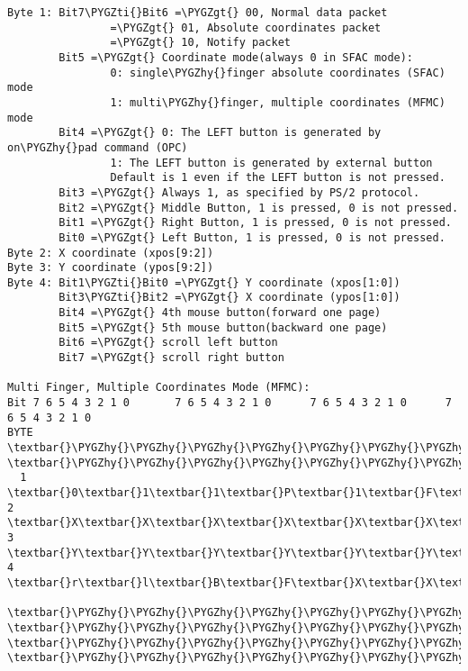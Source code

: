 \documentclass[a4paper,8pt,english]{sphinxmanual}
\def\PYGZgt{\char`\>}
\def\PYGZhy{\char`\-}
\def\PYGZti{\char`\~}
\begin{document}
\begin{Verbatim}[commandchars=\\\{\}]
Byte 1: Bit7\PYGZti{}Bit6 =\PYGZgt{} 00, Normal data packet
                =\PYGZgt{} 01, Absolute coordinates packet
                =\PYGZgt{} 10, Notify packet
        Bit5 =\PYGZgt{} Coordinate mode(always 0 in SFAC mode):
                0: single\PYGZhy{}finger absolute coordinates (SFAC) mode
                1: multi\PYGZhy{}finger, multiple coordinates (MFMC) mode
        Bit4 =\PYGZgt{} 0: The LEFT button is generated by on\PYGZhy{}pad command (OPC)
                1: The LEFT button is generated by external button
                Default is 1 even if the LEFT button is not pressed.
        Bit3 =\PYGZgt{} Always 1, as specified by PS/2 protocol.
        Bit2 =\PYGZgt{} Middle Button, 1 is pressed, 0 is not pressed.
        Bit1 =\PYGZgt{} Right Button, 1 is pressed, 0 is not pressed.
        Bit0 =\PYGZgt{} Left Button, 1 is pressed, 0 is not pressed.
Byte 2: X coordinate (xpos[9:2])
Byte 3: Y coordinate (ypos[9:2])
Byte 4: Bit1\PYGZti{}Bit0 =\PYGZgt{} Y coordinate (xpos[1:0])
        Bit3\PYGZti{}Bit2 =\PYGZgt{} X coordinate (ypos[1:0])
        Bit4 =\PYGZgt{} 4th mouse button(forward one page)
        Bit5 =\PYGZgt{} 5th mouse button(backward one page)
        Bit6 =\PYGZgt{} scroll left button
        Bit7 =\PYGZgt{} scroll right button

Multi Finger, Multiple Coordinates Mode (MFMC):
Bit 7 6 5 4 3 2 1 0       7 6 5 4 3 2 1 0      7 6 5 4 3 2 1 0      7 6 5 4 3 2 1 0
BYTE  \textbar{}\PYGZhy{}\PYGZhy{}\PYGZhy{}\PYGZhy{}\PYGZhy{}\PYGZhy{}\PYGZhy{}\PYGZhy{}\PYGZhy{}\PYGZhy{}\PYGZhy{}\PYGZhy{}\PYGZhy{}\PYGZhy{}\PYGZhy{}\textbar{}BYTE \textbar{}\PYGZhy{}\PYGZhy{}\PYGZhy{}\PYGZhy{}\PYGZhy{}\PYGZhy{}\PYGZhy{}\PYGZhy{}\PYGZhy{}\PYGZhy{}\PYGZhy{}\PYGZhy{}\PYGZhy{}\PYGZhy{}\PYGZhy{}\textbar{}BYTE\textbar{}\PYGZhy{}\PYGZhy{}\PYGZhy{}\PYGZhy{}\PYGZhy{}\PYGZhy{}\PYGZhy{}\PYGZhy{}\PYGZhy{}\PYGZhy{}\PYGZhy{}\PYGZhy{}\PYGZhy{}\PYGZhy{}\PYGZhy{}\textbar{}BYTE\textbar{}\PYGZhy{}\PYGZhy{}\PYGZhy{}\PYGZhy{}\PYGZhy{}\PYGZhy{}\PYGZhy{}\PYGZhy{}\PYGZhy{}\PYGZhy{}\PYGZhy{}\PYGZhy{}\PYGZhy{}\PYGZhy{}\PYGZhy{}\textbar{}
  1   \textbar{}0\textbar{}1\textbar{}1\textbar{}P\textbar{}1\textbar{}F\textbar{}R\textbar{}L\textbar{}  2  \textbar{}X\textbar{}X\textbar{}X\textbar{}X\textbar{}X\textbar{}X\textbar{}X\textbar{}X\textbar{}  3 \textbar{}Y\textbar{}Y\textbar{}Y\textbar{}Y\textbar{}Y\textbar{}Y\textbar{}Y\textbar{}Y\textbar{}  4 \textbar{}r\textbar{}l\textbar{}B\textbar{}F\textbar{}X\textbar{}X\textbar{}Y\textbar{}Y\textbar{}
      \textbar{}\PYGZhy{}\PYGZhy{}\PYGZhy{}\PYGZhy{}\PYGZhy{}\PYGZhy{}\PYGZhy{}\PYGZhy{}\PYGZhy{}\PYGZhy{}\PYGZhy{}\PYGZhy{}\PYGZhy{}\PYGZhy{}\PYGZhy{}\textbar{}     \textbar{}\PYGZhy{}\PYGZhy{}\PYGZhy{}\PYGZhy{}\PYGZhy{}\PYGZhy{}\PYGZhy{}\PYGZhy{}\PYGZhy{}\PYGZhy{}\PYGZhy{}\PYGZhy{}\PYGZhy{}\PYGZhy{}\PYGZhy{}\textbar{}    \textbar{}\PYGZhy{}\PYGZhy{}\PYGZhy{}\PYGZhy{}\PYGZhy{}\PYGZhy{}\PYGZhy{}\PYGZhy{}\PYGZhy{}\PYGZhy{}\PYGZhy{}\PYGZhy{}\PYGZhy{}\PYGZhy{}\PYGZhy{}\textbar{}    \textbar{}\PYGZhy{}\PYGZhy{}\PYGZhy{}\PYGZhy{}\PYGZhy{}\PYGZhy{}\PYGZhy{}\PYGZhy{}\PYGZhy{}\PYGZhy{}\PYGZhy{}\PYGZhy{}\PYGZhy{}\PYGZhy{}\PYGZhy{}\textbar{}


\end{Verbatim}
\end{document}
